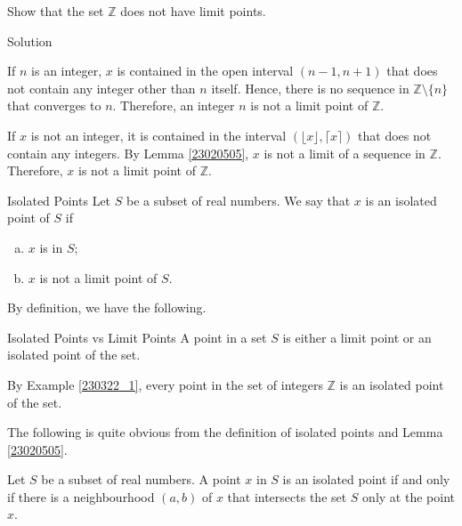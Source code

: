 \begin{example}[label=230322_1]{}
Show that the set $\mathbb{Z}$ does not have limit points.
\end{example}

\begin{solution}{Solution}

If $n$ is an integer, $x$ is contained in the open interval $(n-1,n+1)$ that does not contain any integer other than $n$ itself. Hence, there is no sequence in $\mathbb{Z}\setminus \{n\}$ that converges to $n$. Therefore, an integer $n$ is not a limit point of $\mathbb{Z}$.\bs

If $x$ is not an integer, it is contained in the interval $(\lfloor x\rfloor, \lceil x\rceil)$ that does not contain any integers. By Lemma \ref{23020505}, $x$ is not a limit of a sequence in $\mathbb{Z}$. Therefore, $x$ is not a limit point of $\mathbb{Z}$.
\end{solution}


\begin{definition}{Isolated Points}
Let $S$ be a subset of real numbers. We say that $x$ is an isolated point of $S$ if 
\begin{enumerate}[(a)]
\item $x$ is in $S$;
\item $x$ is not a limit point of $S$.
\end{enumerate}
\end{definition}

By definition, we have the following.
\begin{highlight}{Isolated Points vs Limit Points}
A point in a set $S$ is either a limit point or an isolated point of the set.
\end{highlight}

\begin{example}{}
By Example \ref{230322_1}, every point in the set of integers $\mathbb{Z}$ is an isolated point of the set.
\end{example}

The following is quite obvious from the definition of isolated points and Lemma \ref{23020505}.
\begin{theorem}[label=23020810]{}
Let $S$ be a subset of real numbers. A point $x$ in $S$ is an isolated  point if and only if there is a neighbourhood  $(a,b)$ of  $x$ that intersects the set $S$ only at the point $x$.
\end{theorem}

